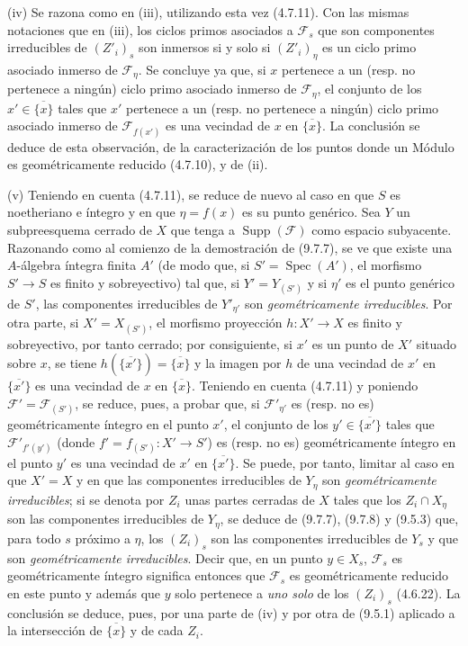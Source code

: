 (iv) Se razona como en (iii), utilizando esta vez (4.7.11). Con las
mismas notaciones que en (iii), los ciclos primos asociados a $\mathcal F_s$
que son componentes irreducibles de $(Z'_i)_s$ son inmersos si y
solo si $(Z'_i)_\eta$ es un ciclo primo asociado inmerso de
$\mathcal F_\eta$. Se concluye ya que, si $x$ pertenece a un (resp.
no pertenece a ningún) ciclo primo asociado inmerso de $\mathcal F_\eta$,
el conjunto de los $x'\in\overline{\{x\}}$ tales que $x'$ pertenece a un (resp.
no pertenece a ningún) ciclo primo asociado inmerso de $\mathcal F_{f(x')}$
es una vecindad de $x$ en $\overline{\{x\}}$. La conclusión se deduce de esta
observación, de la caracterización de los puntos donde un Módulo es geométricamente
reducido (4.7.10), y de (ii).

(v) Teniendo en cuenta (4.7.11), se reduce de nuevo al caso en que $S$ es noetheriano
e íntegro y en que $\eta=f(x)$ es su punto genérico. Sea $Y$ un
subpreesquema cerrado de $X$ que tenga a $\operatorname{Supp}(\mathcal F)$ como espacio
subyacente. Razonando como al comienzo de la demostración de (9.7.7), se ve
que existe una $A$-álgebra íntegra finita $A'$ (de modo que, si
$S'=\operatorname{Spec}(A')$, el morfismo $S'\to S$ es finito y sobreyectivo)
tal que, si $Y'=Y_{(S')}$ y si $\eta'$ es el punto genérico de $S'$, las
componentes irreducibles de $Y'_{\eta'}$ son \emph{geométricamente irreducibles}.
Por otra parte, si $X'=X_{(S')}$, el morfismo proyección $h:X'\to X$ es finito
y sobreyectivo, por tanto cerrado; por consiguiente, si $x'$ es un punto de $X'$ situado sobre
$x$, se tiene $h(\overline{\{x'\}})=\overline{\{x\}}$ y la imagen por $h$ de una
vecindad de $x'$ en $\overline{\{x'\}}$ es una vecindad de $x$ en
$\overline{\{x\}}$. Teniendo en cuenta (4.7.11) y poniendo
$\mathcal F'=\mathcal F_{(S')}$, se reduce, pues, a probar que, si
$\mathcal F'_{\eta'}$ es (resp. no es) geométricamente íntegro en el punto
$x'$, el conjunto de los $y'\in\overline{\{x'\}}$ tales que
$\mathcal F'_{f'(y')}$ (donde $f'=f_{(S')}:X'\to S'$) es (resp. no es)
geométricamente íntegro en el punto $y'$ es una vecindad de $x'$ en
$\overline{\{x'\}}$. Se puede, por tanto, limitar al caso en que $X'=X$ y en que las
componentes irreducibles de $Y_\eta$ son \emph{geométricamente irreducibles}; si
se denota por $Z_i$ unas partes cerradas de $X$ tales que los
$Z_i\cap X_\eta$ son las
componentes irreducibles de $Y_\eta$, se deduce de (9.7.7), (9.7.8) y
(9.5.3) que, para todo $s$ próximo a $\eta$, los $(Z_i)_s$ son las componentes
irreducibles de $Y_s$ y que son \emph{geométricamente irreducibles}.
Decir que, en un punto $y\in X_s$, $\mathcal F_s$ es geométricamente íntegro
significa entonces que $\mathcal F_s$ es geométricamente reducido en este punto y
además que $y$ solo pertenece a \emph{uno solo} de los $(Z_i)_s$ (4.6.22). La
conclusión se deduce, pues, por una parte de (iv) y por otra de (9.5.1) aplicado a
la intersección de $\overline{\{x\}}$ y de cada $Z_i$.

